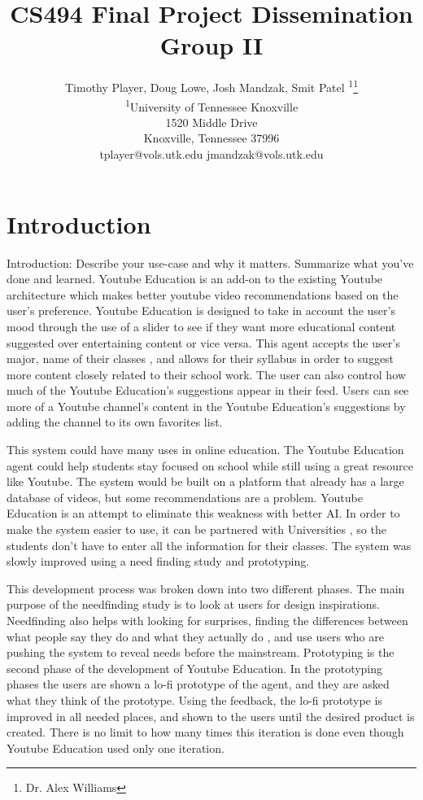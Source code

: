 \documentclass[letterpaper]{article} %
\title{CS494 Final Project Dissemination Group II}
\author{Timothy Player, Doug Lowe, Josh Mandzak, Smit Patel \textsuperscript{\rm 1}\thanks{Dr. Alex Williams}\\ %
\textsuperscript{\rm 1}University of Tennessee Knoxville\\ %
1520 Middle Drive\\
Knoxville, Tennessee  37996\\
tplayer@vols.utk.edu jmandzak@vols.utk.edu%
}
\begin{document}
\maketitle
\section{Introduction}
Introduction: Describe your use-case and why it matters. Summarize what you've done and learned.
Youtube Education is an add-on to the existing Youtube architecture which makes better youtube video recommendations based on the user’s preference. Youtube Education is designed to take in account the user’s mood through the use of a slider to see if they want more educational content suggested over entertaining content or vice versa. This agent accepts the user’s major, name of their classes , and allows for their syllabus in order to suggest more content closely related to their school work. The user can also control how much of the Youtube Education’s suggestions appear in their feed. Users can see more of a Youtube channel’s content in the Youtube Education’s suggestions by adding the channel to its own favorites list. 


	This system could have many uses in online education. The Youtube Education agent could help students stay focused on school while still using a great resource like Youtube. The system would be built on a platform that already has a large database of videos, but some recommendations are a problem. Youtube Education is an attempt to eliminate this weakness with better AI. In order to make the system easier to use, it can be partnered with Universities , so the students don’t have to enter all the information for their classes. The system was slowly improved using a need finding study and prototyping. 


	This development process was broken down into two different phases. The main purpose of the needfinding study is to look at users for design inspirations. Needfinding also helps with looking for surprises, finding the differences between what people say they do and what they actually do , and use users who are pushing the system to reveal needs before the mainstream. Prototyping is the second phase of the development of Youtube Education. In the prototyping phases the users are shown a lo-fi prototype of the agent, and they are asked what they think of the prototype. Using the feedback, the lo-fi prototype is improved in all needed places, and shown to the users until the desired product is created.  There is no limit to how many times this iteration is done even though Youtube Education used only one iteration.
\end{document}
